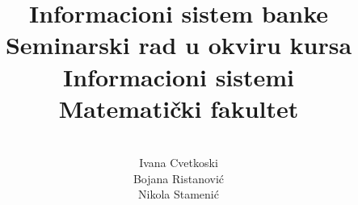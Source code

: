 \documentclass{article}
\begin{document}
\title{Informacioni sistem banke\\ \small{Seminarski rad u okviru kursa\\Informacioni sistemi\\ Matematički fakultet}}
\author{\\
Ivana Cvetkoski
\\
Bojana Ristanović
\\
Nikola Stamenić
}
\end{document}
